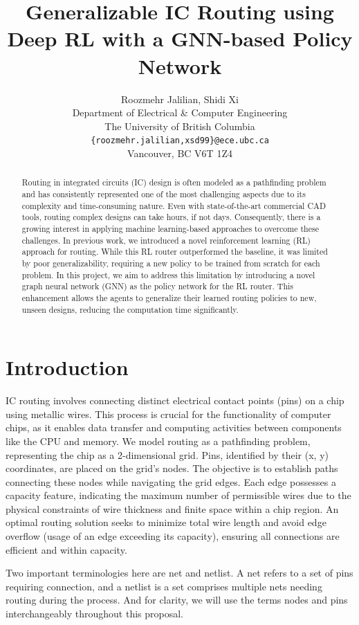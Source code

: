 \documentclass[letterpaper]{article}
\title{Generalizable IC Routing using Deep RL with a GNN-based Policy Network}
\author{%
    Roozmehr Jalilian, Shidi Xi \\
    Department of Electrical \& Computer Engineering \\
    The University of British Columbia \\
    \texttt{\{roozmehr.jalilian,xsd99\}@ece.ubc.ca} \\
    Vancouver, BC V6T 1Z4
}
\begin{document}
\maketitle


\begin{abstract}
Routing in integrated circuits (IC) design is often modeled as a pathfinding problem and has consistently represented one of the most challenging aspects due to its complexity and time-consuming nature. Even with state-of-the-art commercial CAD tools, routing complex designs can take hours, if not days. Consequently, there is a growing interest in applying machine learning-based approaches to overcome these challenges. In previous work, we introduced a novel reinforcement learning (RL) approach for routing. While this RL router outperformed the baseline, it was limited by poor generalizability, requiring a new policy to be trained from scratch for each problem. In this project, we aim to address this limitation by introducing a novel graph neural network (GNN) as the policy network for the RL router. This enhancement allows the agents to generalize their learned routing policies to new, unseen designs, reducing the computation time significantly.
\end{abstract}

\section{Introduction}
IC routing involves connecting distinct electrical contact points (pins) on a chip using metallic wires. This process is crucial for the functionality of computer chips, as it enables data transfer and computing activities between components like the CPU and memory. We model routing as a pathfinding problem, representing the chip as a 2-dimensional grid. Pins, identified by their (x, y) coordinates, are placed on the grid's nodes. The objective is to establish paths connecting these nodes while navigating the grid edges. Each edge possesses a capacity feature, indicating the maximum number of permissible wires due to the physical constraints of wire thickness and finite space within a chip region. An optimal routing solution seeks to minimize total wire length and avoid edge overflow (usage of an edge exceeding its capacity), ensuring all connections are efficient and within capacity.

Two important terminologies here are net and netlist. A net refers to a set of pins requiring connection, and a netlist is a set comprises multiple nets needing routing during the process. And for clarity, we will use the terms nodes and pins interchangeably throughout this proposal.
\end{document}
